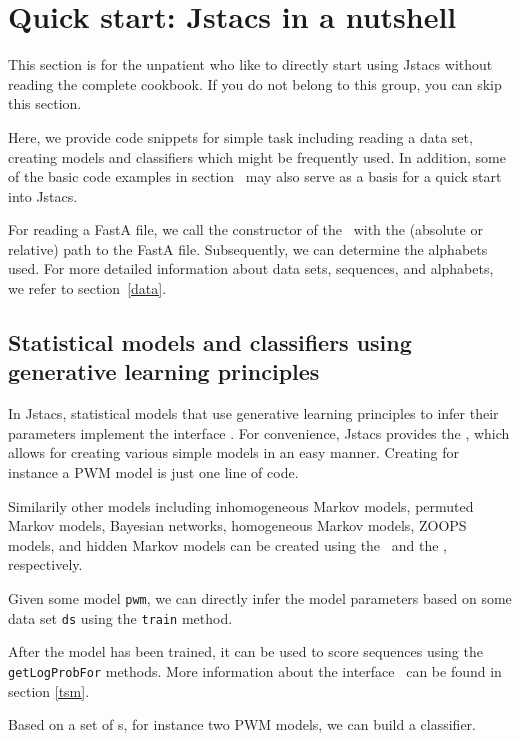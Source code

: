 \section{Quick start: Jstacs in a nutshell}\label{start}
\renewcommand{\codefile}{recipes/TrainPWM.java}
This section is for the unpatient who like to directly start using Jstacs without reading the complete cookbook. If you do not belong to this group, you can skip this section.

Here, we provide code snippets for simple task including reading a data set, creating models and classifiers which might be frequently used. In addition, some of the basic code examples in section~ may also serve as a basis for a quick start into Jstacs.

For reading a FastA file, we call the constructor of the \DNADataSet~with the (absolute or relative) path to the FastA file. Subsequently, we can determine the alphabets used.
\setcounter{off}{37}
For more detailed information about data sets, sequences, and alphabets, we refer to section~\ref{data}.

\subsection{Statistical models and classifiers using generative learning principles}

In Jstacs, statistical models that use generative learning principles to infer their parameters implement the interface \TrainSM. For convenience, Jstacs provides the \TrainSMFactory, which allows for creating various simple models in an easy manner. Creating for instance a PWM model is just one line of code.
\addtocounter{off}{3}
Similarily other models including inhomogeneous Markov models, permuted Markov models, Bayesian networks, homogeneous Markov models, ZOOPS models, and hidden Markov models can be created using the \TrainSMFactory~and the \HMMFactory, respectively.

Given some model \lstinline+pwm+, we can directly infer the model parameters based on some data set \lstinline+ds+ using the \lstinline+train+ method.
\addtocounter{off}{2}
After the model has been trained, it can be used to score sequences using the \lstinline+getLogProbFor+ methods. More information about the interface \TrainSM~can be found in section \ref{tsm}.

Based on a set of \TrainSM s, for instance two PWM models, we can build a classifier.
\renewcommand{\codefile}{\defaultcodefile}
\setcounter{off}{554}

